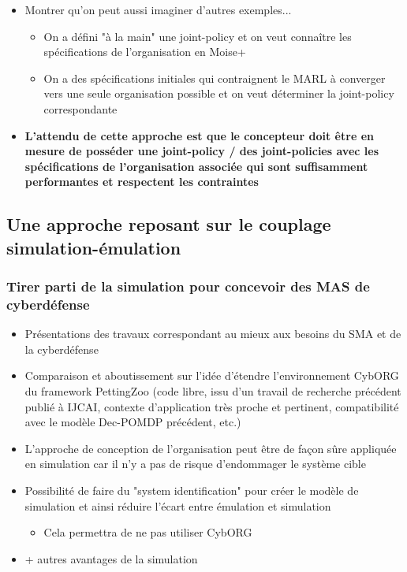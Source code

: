 \begin{itemize}
\begin{itemize}
\begin{itemize}
                    \end{itemize}
          \end{itemize}
    \item Montrer qu'on peut aussi imaginer d'autres exemples...
          \begin{itemize}
              \item On a défini "à la main" une joint-policy et on veut connaître les spécifications de l'organisation en Moise+
              \item On a des spécifications initiales qui contraignent le MARL à converger vers une seule organisation possible et on veut déterminer la joint-policy correspondante
          \end{itemize}
    \item \textbf{L'attendu de cette approche est que le concepteur doit être en mesure de posséder une joint-policy / des joint-policies avec les spécifications de l'organisation associée qui sont suffisamment performantes et respectent les contraintes}
\end{itemize}

\subsection{Une approche reposant sur le couplage simulation-émulation}

\subsubsection{Tirer parti de la simulation pour concevoir des MAS de cyberdéfense}
\begin{itemize}

    \item Présentations des travaux correspondant au mieux aux besoins du SMA et de la cyberdéfense
    \item Comparaison et aboutissement sur l'idée d'étendre l'environnement CybORG du framework PettingZoo (code libre, issu d'un travail de recherche précédent publié à IJCAI, contexte d'application très proche et pertinent, compatibilité avec le modèle Dec-POMDP précédent, etc.)
    \item L'approche de conception de l'organisation peut être de façon sûre appliquée en simulation car il n'y a pas de risque d'endommager le système cible
    \item Possibilité de faire du "system identification" pour créer le modèle de simulation et ainsi réduire l'écart entre émulation et simulation
          \begin{itemize}
              \item Cela permettra de ne pas utiliser CybORG
          \end{itemize}
    \item + autres avantages de la simulation
\end{itemize}

